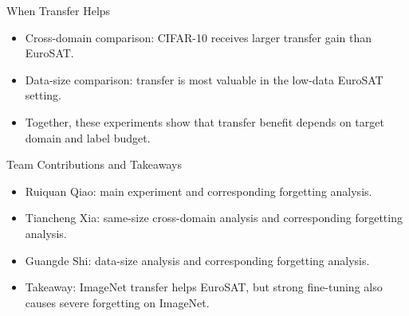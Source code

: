 \documentclass[aspectratio=169]{beamer}
\begin{document}
\begin{frame}{When Transfer Helps}
  \begin{itemize}
    \item Cross-domain comparison: CIFAR-10 receives larger transfer gain than EuroSAT.
    \item Data-size comparison: transfer is most valuable in the low-data EuroSAT setting.
    \item Together, these experiments show that transfer benefit depends on target domain and label budget.
  \end{itemize}
\end{frame}

\begin{frame}{Team Contributions and Takeaways}
  \begin{itemize}
    \item Ruiquan Qiao: main experiment and corresponding forgetting analysis.
    \item Tiancheng Xia: same-size cross-domain analysis and corresponding forgetting analysis.
    \item Guangde Shi: data-size analysis and corresponding forgetting analysis.
    \item Takeaway: ImageNet transfer helps EuroSAT, but strong fine-tuning also causes severe forgetting on ImageNet.
  \end{itemize}
\end{frame}
\end{document}
